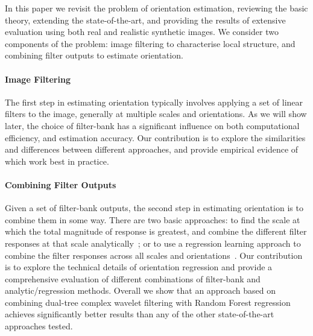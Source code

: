 \documentclass[runningheads,a4paper]{llncs}
\def\dtcwt{DT-$\mathbb{C}$WT}
\newcommand{\comment}[1]{}
\begin{document}
In this paper we revisit the problem of orientation estimation, reviewing the basic theory, extending the state-of-the-art, and providing the results of extensive evaluation using both real and realistic synthetic images. We consider two components of the problem: image filtering to characterise local structure, and combining filter outputs to estimate orientation.

\paragraph{Image Filtering}
The first step in estimating orientation typically involves applying a set of linear filters to the image, generally at multiple scales and orientations. As we will show later, the choice of filter-bank has a significant influence on both computational efficiency, and estimation accuracy. Our contribution is to explore the similarities and differences between different approaches, and provide empirical evidence of which work best in practice.

\paragraph{Combining Filter Outputs}
Given a set of filter-bank outputs, the second step in estimating orientation is to combine them in some way. There are two basic approaches: to find the scale at which the total magnitude of response is greatest, and combine the different filter responses at that scale analytically~\cite{Karssemeijer_teBrake_TMI96,Mei_etal_IVC09}; or to use a regression learning approach to combine the filter responses across all scales and orientations~\cite{Berks_etal_IPMI11}. Our contribution is to explore the technical details of orientation regression and provide a comprehensive evaluation of different combinations of filter-bank and analytic/regression methods. Overall we show that an approach based on combining dual-tree complex wavelet filtering with Random Forest regression achieves significantly better results than any of the other state-of-the-art approaches tested. \comment{Whilst combining the \dtcwt~ and Random Forests has previously been proposed for line detection, classification and orientation estimation in mammograms \cite{Chen_etal_IWDM10, Berks_etal_IPMI11}, we are not aware of any thorough presentation of the theoretical grounding for their use as orientation estimators. Additionally, we note that the description of orientation regression in \cite{Berks_etal_IPMI11} does not describe the modifications necessary to produce sensible splitting criteria for circular data. This paper significantly adds to the empirical evidence whilst also contributing the theoretical and technical information required to expand the method general data.}
\end{document}
